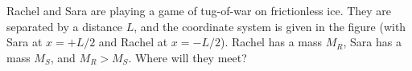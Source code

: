 Rachel and Sara are playing a game of tug-of-war on frictionless ice.
They are separated by a distance $L$, and the coordinate
system is given in the figure (with Sara at $x = +L/2$ and Rachel at
$x = -L/2$). Rachel has a mass $M_R$, Sara has a mass $M_S$, and $M_R> M_S$.
Where will they meet?
